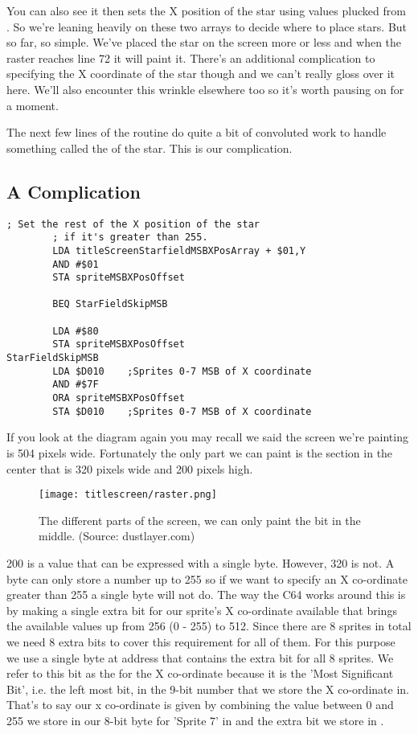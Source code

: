 You can also see it then sets the X position of the star using values plucked from .
So we're leaning heavily on these two arrays to decide where to place stars. But so far, so simple. We've placed the star
on the screen more or less and when the raster reaches line 72 it will paint it. There's an additional complication to 
specifying the X coordinate of the star though and we can't really gloss over it here. We'll also encounter this
wrinkle elsewhere too so it's worth pausing on for a moment.

The next few lines of the routine do quite a bit of convoluted work to handle something called the  of the
star. This is our complication. 

\subsection{A Complication}
\begin{lstlisting}[caption= MSBXPos.. some'it.]
        ; Set the rest of the X position of the star
        ; if it's greater than 255.
        LDA titleScreenStarfieldMSBXPosArray + $01,Y
        AND #$01
        STA spriteMSBXPosOffset

        BEQ StarFieldSkipMSB

        LDA #$80
        STA spriteMSBXPosOffset
StarFieldSkipMSB   
        LDA $D010    ;Sprites 0-7 MSB of X coordinate
        AND #$7F
        ORA spriteMSBXPosOffset
        STA $D010    ;Sprites 0-7 MSB of X coordinate

\end{lstlisting}

If you look at the diagram again you may recall we said the screen we're painting is 504 pixels wide. Fortunately the only 
part we can paint is the section in the center that is 320 pixels wide and 200 pixels high. 

\begin{figure}[H]
    \centering
      \texttt{[image: titlescreen/raster.png]}%
  \caption{The different parts of the screen, we can only paint the bit in the middle. (Source: dustlayer.com)}
\end{figure}

200 is a value that can be expressed with a single byte. However, 320 is not. A byte can only store a number up to 255
so if we want to specify an X co-ordinate greater than 255 a single byte will not do. The way the C64 works around this
is by making a single extra bit for our sprite's X co-ordinate available that brings the available values up from 256
(0 - 255) to 512. Since there are 8 sprites in total we need 8 extra bits to cover this requirement for all of them.
For this purpose we use a single byte at address  that contains the extra bit for all 8 sprites. We refer
to this bit as the  for the X co-ordinate because it is the 'Most Significant Bit', i.e. the left most bit,
in the 9-bit number that we store the X co-ordinate in. That's to say our x co-ordinate is given by combining the value
between 0 and 255 we store in our 8-bit byte for 'Sprite 7' in  and the extra bit we store in .

